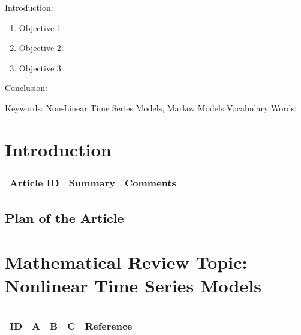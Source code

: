 


\twocolumn
\scriptsize
\begin{frontmatter}
		\title{}
		\author{}
		\address{The Mathematical Learning Space}
\end{frontmatter}	

Introduction:
\begin{enumerate}
\item Objective 1:
\item Objective 2:
\item Objective 3:
\end{enumerate}
Conclusion:

Keywords: Non-Linear Time Series Models, Markov Models
Vocabulary Words:

\section{Introduction}

\begin{table}[H]\centering
	\begin{tabular}{p{1cm}p{4cm}p{3cm}}
		Article ID & Summary & Comments\\
		\hline
		\hline
	\end{tabular}
\end{table}


\subsection{Plan of the Article}

\begin{enumerate}
\end{enumerate}


\section{Mathematical Review Topic: Nonlinear Time Series Models}

\centering
\begin{table}[H]\footnotesize
	\caption{}
	\begin{tabular}{rp{1cm}p{2cm}p{3cm}p{1cm}}
		\hline
		ID & A & B & C & Reference \\
		\hline
		\hline
	\end{tabular}
\end{table}
\raggedright

